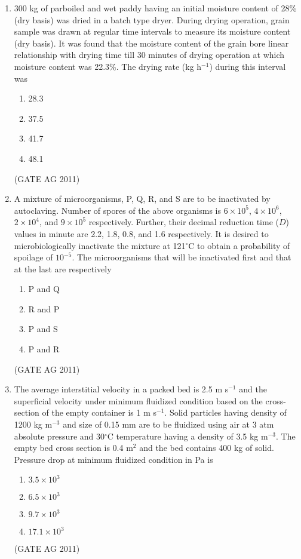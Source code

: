 \documentclass[journal,12pt,onecolumn]{IEEEtran}
\theoremstyle{remark}
\begin{document}
\begin{enumerate}
\item 
300 kg of parboiled and wet paddy having an initial moisture content of 28\% (dry basis) was dried in a batch type dryer. During drying operation, grain sample was drawn at regular time intervals to measure its moisture content (dry basis). It was found that the moisture content of the grain bore linear relationship with drying time till 30 minutes of drying operation at which moisture content was 22.3\%. The drying rate (kg h$^{-1}$) during this interval was
\begin{multicols}{4}
\begin{enumerate}
    \item 28.3
    \item 37.5
    \item 41.7
    \item 48.1
\end{enumerate}
\end{multicols}
\hfill{(GATE AG 2011)}

\item 
A mixture of microorganisms, P, Q, R, and S are to be inactivated by autoclaving. Number of spores of the above organisms is $6 \times 10^5$, $4 \times 10^6$, $2 \times 10^4$, and $9 \times 10^5$ respectively. Further, their decimal reduction time ($D$) values in minute are 2.2, 1.8, 0.8, and 1.6 respectively. It is desired to microbiologically inactivate the mixture at 121$^\circ$C to obtain a probability of spoilage of $10^{-5}$. The microorganisms that will be inactivated first and that at the last are respectively
\begin{multicols}{4}
\begin{enumerate}
    \item P and Q
    \item R and P
    \item P and S
    \item P and R
\end{enumerate}
\end{multicols}
\hfill{(GATE AG 2011)}

\item 
The average interstitial velocity in a packed bed is 2.5 m s$^{-1}$ and the superficial velocity under minimum fluidized condition based on the cross-section of the empty container is 1 m s$^{-1}$. Solid particles having density of 1200 kg m$^{-3}$ and size of 0.15 mm are to be fluidized using air at 3 atm absolute pressure and 30$^\circ$C temperature having a density of 3.5 kg m$^{-3}$. The empty bed cross section is 0.4 m$^2$ and the bed contains 400 kg of solid. Pressure drop at minimum fluidized condition in Pa is
\begin{multicols}{4}
\begin{enumerate}
    \item $3.5 \times 10^3$
    \item $6.5 \times 10^3$
    \item $9.7 \times 10^3$
    \item $17.1 \times 10^3$
\end{enumerate}
\end{multicols}
\hfill{(GATE AG 2011)}


\end{enumerate}
\end{document}
